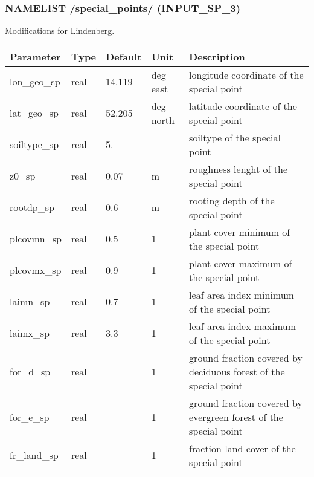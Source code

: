 \documentclass[a4paper,10pt,DIV14,BCOR1cm,titlepage,twoside]{scrartcl}
\providecommand{\tabularnewline}{\\}
\begin{document}
\subsubsection*{NAMELIST /special\_points/ (INPUT\_SP\_3)}
Modifications for Lindenberg.\\
\begin{longtable}{|p{4cm}|p{1.5cm}|p{1.5cm}|p{1cm}|p{6cm}|}
\hline 
\textbf{Parameter}& \textbf{Type}& \textbf{Default}& \textbf{Unit}& \textbf{Description}
\tabularnewline
\hline
\endhead
\hline 
lon\_geo\_sp & real & 14.119 & deg east & longitude coordinate of the special point\tabularnewline\hline
lat\_geo\_sp & real & 52.205 & deg north & latitude coordinate of the special point\tabularnewline\hline
soiltype\_sp & real & 5. & - & soiltype of the special point\tabularnewline\hline
z0\_sp & real & 0.07 & m & roughness lenght of the special point\tabularnewline\hline
rootdp\_sp & real & 0.6 & m & rooting depth of the special point\tabularnewline\hline
plcovmn\_sp & real & 0.5 & 1 & plant cover minimum of the special point\tabularnewline\hline
plcovmx\_sp & real & 0.9 & 1 &plant cover maximum of the special point\tabularnewline\hline
laimn\_sp & real & 0.7 & 1 & leaf area index minimum of the special point\tabularnewline\hline
laimx\_sp & real & 3.3 & 1 &leaf area index maximum of the special point\tabularnewline\hline
for\_d\_sp & real & & 1 & ground fraction covered by deciduous forest of the special point\tabularnewline\hline
for\_e\_sp & real & & 1 & ground fraction covered by evergreen forest of the special point\tabularnewline\hline
fr\_land\_sp & real & & 1 & fraction land cover of the special point\tabularnewline\hline
\bottomrule
\end{longtable}
\end{document}
